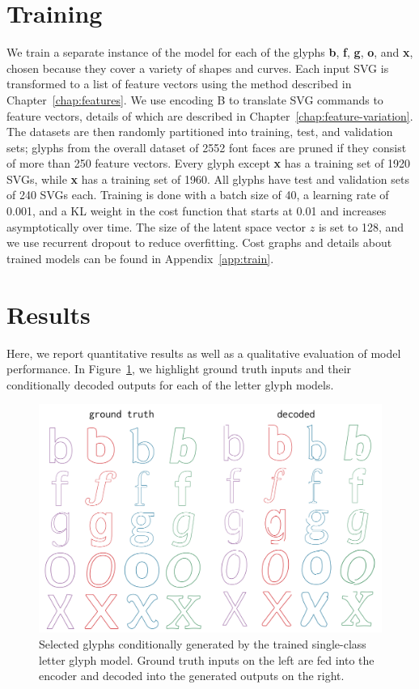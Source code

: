 \section{Training}\label{sec:training}
We train a separate instance of the model for each of the glyphs \textbf{b}, \textbf{f}, \textbf{g}, \textbf{o}, and \textbf{x}, chosen because they cover a variety of shapes and curves.
Each input SVG is transformed to a list of feature vectors using the method described in Chapter~\ref{chap:features}.
We use encoding B to translate SVG commands to feature vectors, details of which are described in Chapter~\ref{chap:feature-variation}.
The datasets are then randomly partitioned into training, test, and validation sets; glyphs from the overall dataset of 2552 font faces are pruned if they consist of more than 250 feature vectors.
Every glyph except \textbf{x} has a training set of 1920 SVGs, while \textbf{x} has a training set of 1960.
All glyphs have test and validation sets of 240 SVGs each.
Training is done with a batch size of 40, a learning rate of 0.001, and a KL weight in the cost function that starts at 0.01 and increases asymptotically over time.
The size of the latent space vector $z$ is set to 128, and we use recurrent dropout to reduce overfitting.
Cost graphs and details about trained models can be found in Appendix~\ref{app:train}.

\section{Results}
Here, we report quantitative results as well as a qualitative evaluation of model performance.
In Figure~\ref{fig:font_gen}, we highlight ground truth inputs and their conditionally decoded outputs for each of the letter glyph models.
\begin{figure}[h]
    \centering
	\includegraphics[width=\textwidth]{figures/font_gen}
    \caption[Visual results of training single-class model on letter glyph datasets]
    {Selected glyphs conditionally generated by the trained single-class letter glyph model.
    Ground truth inputs on the left are fed into the encoder and decoded into the generated outputs on the right.\label{fig:font_gen}}
\end{figure}

